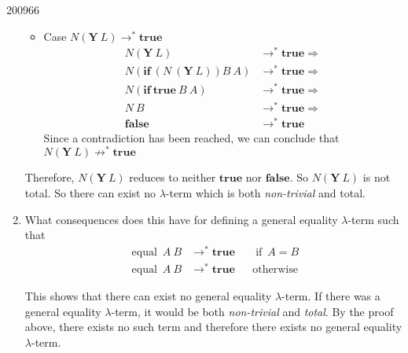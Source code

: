 \documentclass[10pt,\jkfside,a4paper]{article}
\begin{document}
\begin{examquestion}{2009}{6}{6}
\begin{enumerate}
\begin{itemize}
\item Case $N(\mathbf{Y}\ L) \to^* \mathbf{true}$
\begin{align*}
N(\mathbf{Y}\ L) &\to^* \mathbf{true} \Longrightarrow \\
N(\mathbf{if}\ (N\ (\mathbf{Y}\ L)) B\ A) &\to^* \mathbf{true}
\Longrightarrow \\
N(\mathbf{if}\ \mathbf{true}\ B\ A) &\to^* \mathbf{true}
\Longrightarrow \\
N\ B &\to^* \mathbf{true} \Longrightarrow \\
\mathbf{false} &\to^* \mathbf{true}
\end{align*}
Since a contradiction has been reached, we can conclude that
$N(\mathbf{Y}\ L) \not\to^* \mathbf{true}$

\end{itemize}
Therefore, $N(\mathbf{Y}\ L)$ reduces to neither $\mathbf{true}$ nor
$\mathbf{false}$. So $N(\mathbf{Y}\ L)$ is not total. So there can exist no
$\lambda$-term which is both \textit{non-trivial} and total.

\item What consequences does this have for defining a general equality
$\lambda$-term such that
\begin{align*}
\mathop{\text{equal}}\ A\ B & \to^* \mathbf{true} & & \mathop{\text{if}}\ A
 = B\\
\mathop{\text{equal}}\ A\ B & \to^* \mathbf{true} && \mathop{\text{otherwise}}
\end{align*}

This shows that there can exist no general equality $\lambda$-term. If
there was a general equality $\lambda$-term, it would be both
\textit{non-trivial} and \textit{total}. By the proof above, there exists
no such term and therefore there exists no general equality $\lambda$-term.

\end{enumerate}

\end{examquestion}
\end{document}
